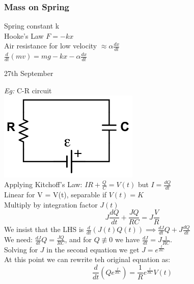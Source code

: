 \documentclass[11pt]{article}
\theoremstyle{definition}
\begin{document}
\subsubsection{Mass on Spring}
Spring constant k \\ Hooke's Law $F = -kx$\\ Air resistance for low velocity $\approx \alpha \frac{dx}{dt}$\\
$\frac{d}{dt}(mv) = mg -kx -\alpha \frac{dx}{dt}$
\newpage
\begin{center}
    {\LARGE 27th September}\\
\end{center}
\textit{Eg:} C-R circuit\\
\includegraphics[width=0.5\textwidth]{RC.png}\\
Applying Kitchoff's Law: $IR + \frac{Q}{C} = V(t)$ but $I = \frac{dQ}{dt}$\\
Linear for V = V(t), separable if $V(t) = K$\\
Multiply by integration factor $J(t)$ \\
$$J\frac{dQ}{dt} + \frac{JQ}{RC} = J\frac{V}{R}$$
We insist that the LHS is $\frac{d}{dt}(J(t)Q(t)) \implies \frac{dJ}{dt}Q + J\frac{dQ}{dt}$\\
We need: $\frac{dJ}{dt}Q = \frac{JQ}{RC}$, and for $Q \not\equiv 0$ we have $\frac{dJ}{dt} = J\frac{1}{RC}$.\\
Solving for $J$ in the second equation we get $J = e^{\frac{t}{RC}}$\\
At this point we can rewrite teh original equation as:
$$\frac{d}{dt}(Qe^{\frac{t}{RC}}) = \frac{1}{R}e^{\frac{t}{RC}}V(t)$$
\end{document}
